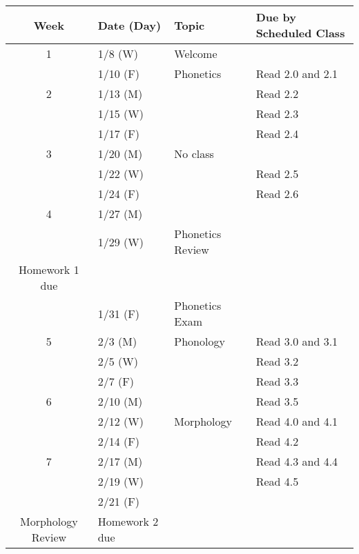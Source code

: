 \documentclass{article}
\makeatletter
\newcommand{\cellbreak}[2]{
    \begin{tabular}[t]{@{}l@{}}
      #1\\
      #2
    \end{tabular}}
\newcommand{\rowvspace}{\rule{0pt}{14pt}}
\makeatother
\begin{document}
    \begin{longtable}{c l l l}
      Week  & Date (Day)  & Topic                           & Due by Scheduled Class\\
      \hline
      1     & 1/8 (W)     & Welcome \rowvspace              & \\
            & 1/10 (F)    & Phonetics                       & Read 2.0 and 2.1\\
      2     & 1/13 (M)    &                                 & Read 2.2\\
            & 1/15 (W)    &                                 & Read 2.3\\
            & 1/17 (F)    &                                 & Read 2.4\\
      3     & 1/20 (M)    & No class                        & \\
            & 1/22 (W)    &                                 & Read 2.5\\
            & 1/24 (F)    &                                 & Read 2.6\\
      4     & 1/27 (M)    &                                 & \\
            & 1/29 (W)    & Phonetics Review                & \cellbreak{Homework 0 and}
                                                                        {Homework 1 due}\\
            & 1/31 (F)    & Phonetics Exam                  & \\
      5     & 2/3 (M)     & Phonology                       & Read 3.0 and 3.1\\
            & 2/5 (W)     &                                 & Read 3.2\\
            & 2/7 (F)     &                                 & Read 3.3\\
      6     & 2/10 (M)    &                                 & Read 3.5\\
            & 2/12 (W)    & Morphology                      & Read 4.0 and 4.1\\
            & 2/14 (F)    &                                 & Read 4.2\\
      7     & 2/17 (M)    &                                 & Read 4.3 and 4.4\\
            & 2/19 (W)    &                                 & Read 4.5\\
            & 2/21 (F)    & \cellbreak{Phonology \&}
                                      {Morphology Review}   & Homework 2 due\\

\end{longtable}
\end{document}
